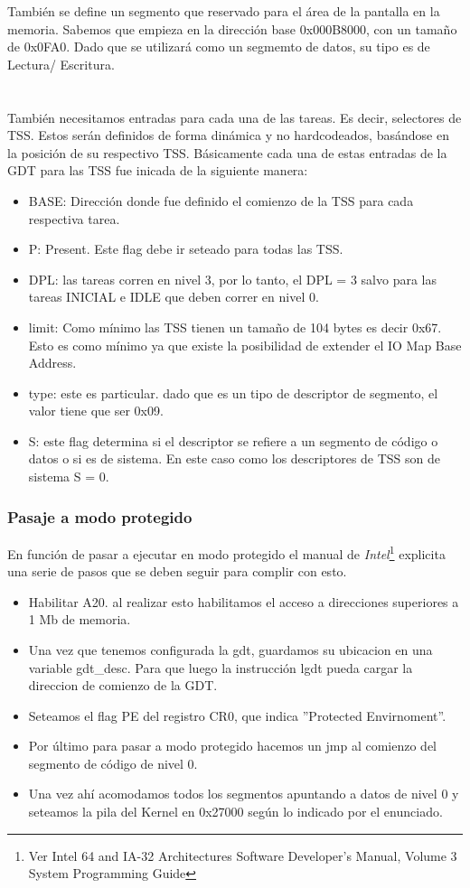 Tambi\'en se define un segmento que reservado para el \'area de la pantalla en la memoria. Sabemos que empieza en la direcci\'on base
0x000B8000, con un tamaño de 0x0FA0. Dado que se utilizar\'a como un segmemto de datos, su tipo es de Lectura/ Escritura.\\\\
\\
Tambi\'en necesitamos entradas para cada una de las tareas. Es decir, selectores de 
TSS. Estos ser\'an definidos de forma din\'amica y no hardcodeados, bas\'andose en la posici\'on de su respectivo TSS. B\'asicamente cada
una de estas entradas de la GDT para las TSS fue inicada de la siguiente manera:
\begin{itemize}
 \item BASE: Direcci\'on donde fue definido el comienzo de la TSS para cada respectiva tarea.
 \item P: Present. Este flag debe ir seteado para todas las TSS.
 \item DPL: las tareas corren en nivel 3, por lo tanto, el DPL = 3 salvo para las tareas INICIAL e IDLE que deben correr en nivel 0.
 \item limit: Como m\'inimo las TSS tienen un tamaño de 104 bytes es decir 0x67. Esto es como m\'inimo ya que existe la posibilidad de
extender el IO Map Base Address.
 \item type: este es particular. dado que es un tipo de descriptor de segmento, el valor tiene que ser 0x09.
 \item S: este flag determina si el descriptor se refiere a un segmento de c\'odigo o datos o si es de sistema. En este caso como los
descriptores de TSS son de sistema S = 0.
\end{itemize}



\subsubsection{Pasaje a modo protegido}

En funci\'on de pasar a ejecutar en modo protegido el manual de \emph{Intel}\footnote{Ver Intel 64 and IA-32 Architectures Software 
Developer's Manual, Volume 3 System Programming Guide} explicita una serie de pasos que se deben seguir para complir con esto.\\
\begin{itemize}
 \item Habilitar A20. al realizar esto habilitamos el acceso a direcciones superiores a 1 Mb de memoria.
 \item Una vez que tenemos configurada la gdt, guardamos su ubicacion en una variable gdt\_desc. Para que luego la instrucci\'on lgdt 
pueda cargar la direccion de comienzo de la GDT.
 \item Seteamos el flag PE del registro CR0, que indica ''Protected Envirnoment''.
 \item Por \'ultimo para pasar a modo protegido hacemos un jmp al comienzo del segmento de c\'odigo de nivel 0.
 \item Una vez ah\'i acomodamos todos los segmentos apuntando a datos de nivel 0 y seteamos la pila del Kernel en 0x27000 seg\'un lo
indicado por el enunciado.
\end{itemize}
